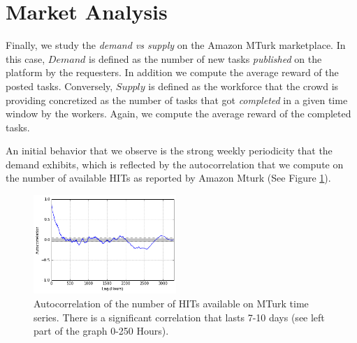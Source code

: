 \section{Market Analysis}
\label{sec:market}
Finally, we study the \emph{demand vs supply} on the Amazon MTurk marketplace.
In this case, $Demand$ is defined as the number of new tasks \emph{published} on the platform by the requesters.
In addition we compute the average reward of the posted tasks.
Conversely, $Supply$ is defined as the workforce that the crowd is providing concretized as the number of tasks that got \emph{completed} in a given time window by the workers.
Again, we compute the average reward of the completed tasks.

An initial behavior that we observe is  the strong weekly periodicity that the demand exhibits, which is reflected by the autocorrelation that we compute on the number of available HITs as reported by Amazon Mturk (See Figure \ref{fig:autocorrelation1}).
\begin{figure}[tb]
	\centering
		\includegraphics[width=0.48\textwidth]{figures/autocorrelation_plot}
	\caption{Autocorrelation of the number of HITs available on MTurk time series.
There is a significant correlation that lasts 7-10 days (see left part of the graph 0-250 Hours).}
	\label{fig:autocorrelation1}
\end{figure}

